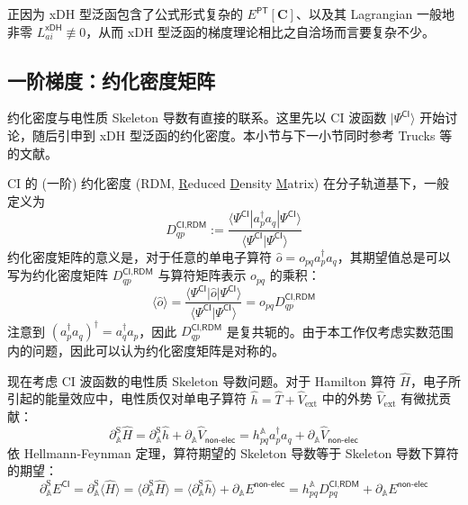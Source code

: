正因为 xDH 型泛函包含了公式形式复杂的 $E^\textsf{PT} [\mathbf{C}]$、以及其 Lagrangian 一般地非零 $L_{ai}^\textsf{xDH} \not \equiv 0$，从而 xDH 型泛函的梯度理论相比之自洽场而言要复杂不少。

\subsection{一阶梯度：约化密度矩阵}

约化密度与电性质 Skeleton 导数有直接的联系。这里先以 CI 波函数 $| \Psi^\textsf{CI} \rangle$ 开始讨论，随后引申到 xDH 型泛函的约化密度。本小节与下一小节同时参考 Trucks 等的文献\cite{Trucks-Bartlett.CPL.1988}。

CI 的 (一阶) 约化密度 (RDM, \underline{R}educed \underline{D}ensity \underline{M}atrix) 在分子轨道基下，一般定义为
\begin{equation}
  \label{eq.3.def.rdm-ci}
  D_{qp}^{\textsf{CI},\textsf{RDM}} := \frac{\langle \Psi^\textsf{CI} | a_p^\dagger a_q | \Psi^\textsf{CI} \rangle}{\langle \Psi^\textsf{CI} | \Psi^\textsf{CI} \rangle}
\end{equation}
约化密度矩阵的意义是，对于任意的单电子算符 $\hat o = o_{pq} a_p^\dagger a_q$，其期望值总是可以写为约化密度矩阵 $D_{qp}^{\textsf{CI},\textsf{RDM}}$ 与算符矩阵表示 $o_{pq}$ 的乘积：
\begin{equation*}
  \langle \hat o \rangle = \frac{\langle \Psi^\textsf{CI} | \hat o | \Psi^\textsf{CI} \rangle}{\langle \Psi^\textsf{CI} | \Psi^\textsf{CI} \rangle} = o_{pq} D_{qp}^{\textsf{CI},\textsf{RDM}}
\end{equation*}
注意到 $(a_p^\dagger a_q)^\dagger = a_q^\dagger a_p$，因此 $D_{qp}^{\textsf{CI},\textsf{RDM}}$ 是复共轭的。由于本工作仅考虑实数范围内的问题，因此可以认为约化密度矩阵是对称的。

现在考虑 CI 波函数的电性质 Skeleton 导数问题。对于 Hamilton 算符 $\hat H$，电子所引起的能量效应中，电性质仅对单电子算符 $\hat h = \hat T + \hat V_\mathrm{ext}$ 中的外势 $\hat V_\mathrm{ext}$ 有微扰贡献：
\begin{equation}
  \partial_{\mathbb{A}}^\mathrm{S} \hat H = \partial_{\mathbb{A}}^\mathrm{S} \hat h + \partial_{\mathbb{A}} \hat V_\textsf{non-elec} = h_{pq}^{\mathbb{A}} a_p^\dagger a_q + \partial_{\mathbb{A}} \hat V_\textsf{non-elec}
\end{equation}
依 Hellmann-Feynman 定理，算符期望的 Skeleton 导数等于 Skeleton 导数下算符的期望：
\begin{equation}
  \partial_{\mathbb{A}}^\mathrm{S} E^\textsf{CI} = \partial_{\mathbb{A}}^\mathrm{S} \langle \hat H \rangle = \langle \partial_{\mathbb{A}}^\mathrm{S} \hat H \rangle = \langle \partial_{\mathbb{A}}^\mathrm{S} \hat h \rangle + \partial_{\mathbb{A}} E^\textsf{non-elec} = h_{pq}^{\mathbb{A}} D_{pq}^{\textsf{CI}, \textsf{RDM}} + \partial_{\mathbb{A}} E^\textsf{non-elec}
\end{equation}

